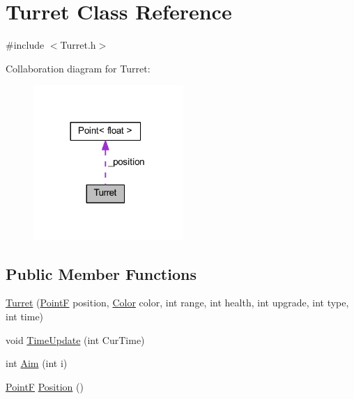 \hypertarget{class_turret}{}\section{Turret Class Reference}
\label{class_turret}


{\ttfamily \#include $<$Turret.\+h$>$}



Collaboration diagram for Turret\+:\nopagebreak
\begin{figure}[H]
\begin{center}
\leavevmode
\includegraphics[width=161pt]{class_turret__coll__graph}
\end{center}
\end{figure}
\subsection*{Public Member Functions}
\begin{DoxyCompactItemize}
\item 
\hyperlink{class_turret_ae3d273bc8b70a66d491f0d05c23b9d1b}{Turret} (\hyperlink{drawtools_8h_adc4a66bcb59b74164130ed47cb387ec3}{PointF} position, \hyperlink{struct_color}{Color} color, int range, int health, int upgrade, int type, int time)
\item 
void \hyperlink{class_turret_a6863dbe8d5a67e6549f159fa76822610}{Time\+Update} (int Cur\+Time)
\item 
int \hyperlink{class_turret_a8d3b80c4fd7534448f5e7e7ce6618062}{Aim} (int i)
\item 
\hyperlink{drawtools_8h_adc4a66bcb59b74164130ed47cb387ec3}{PointF} \hyperlink{class_turret_a86f457d14098684ab3954864b07dc560}{Position} ()
\end{DoxyCompactItemize}
